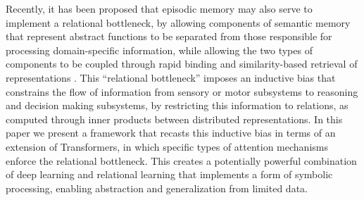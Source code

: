 Recently, it has been proposed that episodic memory may also serve to implement a relational bottleneck,
by allowing components of semantic memory that represent abstract functions to be separated from those
responsible for processing domain-specific information, while allowing the two types of components to be coupled
through rapid binding and similarity-based retrieval of representations \citep{esbn}.
This ``relational bottleneck'' imposes an inductive bias that constrains the flow of information from sensory or
motor subsystems to reasoning and decision making subsystems, by restricting this information to relations, as
computed through inner products between distributed representations.
In this paper we present a framework that recasts this inductive bias in terms of an extension of Transformers, in
which specific types of attention mechanisms enforce the relational bottleneck. This creates a potentially powerful
combination of deep learning and relational learning that implements a form of symbolic processing, enabling
abstraction and generalization from limited data.


